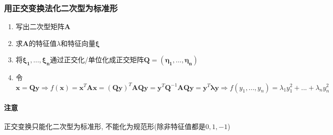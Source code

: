 \subsubsection{用正交变换法化二次型为标准形}
\begin{enumerate}\label{ref:求标准形}
\item 写出二次型矩阵$ \bm{A} $
\item 求$ \bm{A} $的特征值$ \lambda $和特征向量$ \bm{\xi} $
\item 将$ \bm{\xi_{1}},..., \bm{\xi_{n}} $通过正交化/单位化成正交矩阵$ \bm{Q}=(\bm{\eta_{1}},..., \bm{\eta_{n}}) $
\item 令$ \bm{x}=\bm{Q}\bm{y}\Rightarrow f(\bm{x})=\bm{x}^{T}\bm{A}\bm{x}=(\bm{Q}\bm{y})^{T}\bm{A}\bm{Q}\bm{y}=\bm{y}^{T}\bm{Q}^{-1}\bm{A}\bm{Q}\bm{y}=\bm{y}^{T}\bm{\lambda}\bm{y}\Rightarrow f(y_{1},..., y_{n})=\lambda_{1}y_{1}^{2}+... +\lambda_{n}y_{n}^{2} $
\end{enumerate}
\paragraph{注意} 正交变换只能化二次型为标准形, 不能化为规范形(除非特征值都是$ 0, 1, -1 $)\par